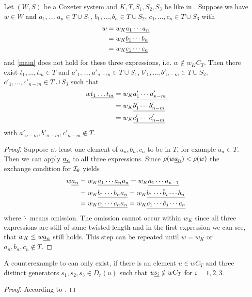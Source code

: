 \begin{prop}
	\label{counterexample-simplification}
	Let $(W,S)$ be a Coxeter system and $K,T,S_1,S_2,S_3$ be like in
	. Suppose we have $w \in W$ and $a_1,\ldots,a_n \in T \cup
	S_1$, $b_1,\ldots,b_n \in T \cup S_2$, $c_1,\ldots,c_n \in T \cup S_3$ with
	\begin{align*}
	w & = w_K \underline{ a_1 \cdots a_n } \\
	  & = w_K \underline{ b_1 \cdots b_n } \\
	  & = w_K \underline{ c_1 \cdots c_n }
	\end{align*}
	and \eqref{main} does not hold for these three expressions, i.e. $w
	\notin w_K C_T$.
	Then there exist $t_1,\ldots,t_m \in T$ and $a'_1,\ldots,a'_{n-m} \in T \cup S_1$,
	$b'_1,\ldots,b'_{n-m} \in T \cup S_2$, $c'_1,\ldots,c'_{n-m} \in T \cup S_3$ such that
	\begin{align*}
	w \underline{t_1 \ldots t_m} & = w_K \underline{ a'_1 \cdots a'_{n-m} } \\
						   & = w_K \underline{ b'_1 \cdots b'_{n-m} } \\
						   & = w_K \underline{ c'_1 \cdots c'_{n-m} }
	\end{align*}
	with $a'_{n-m},b'_{n-m},c'_{n-m} \notin T$.

	\begin{proof}
		Suppose at least one element of $a_n,b_n,c_n$ to be in $T$, for example $a_n \in T$.
		Then we can apply $\underline{a_n}$ to all three expressions. Since $\rho (w \underline{a_n}) < \rho(w)$
		the exchange condition for $\mathcal{I}_{\theta}$ \cite[Proposition 3.10]{hultman:comb-twisted-invo}
		yields
		\begin{align*}
		w \underline{a_n} & = w_K \underline{ a_1 \cdots a_n a_n } = w_K \underline{ a_1 \cdots a_{n-1} } \\
				   & = w_K \underline{ b_1 \cdots b_n a_n } = w_K \underline{ b_1 \cdots \hat b_i \cdots b_n } \\
				   & = w_K \underline{ c_1 \cdots c_n a_n } = w_K \underline{ c_1 \cdots \hat c_j \cdots c_n }
		\end{align*}
		where $\hat \cdot$ means omission. The omission cannot occur within $w_K$ since all three
		expressions are still of same twisted length and in the first expression we can see, that
		$w_K \leq w \underline{a_n}$ still holds. This step can be repeated until $w = w_K$ or
		$a_n,b_n,c_n \notin T$.
	\end{proof}
\end{prop}

\begin{lemm}
	\label{counterexample-simplification}
	A counterexample to  can only exist, if there
	is an element $u \in w C_T$ and three distinct generators $s_1,s_2,s_3 \in
	D_r(u)$ such that $u \underline{s_i} \notin w C_T$ for $i=1,2,3$.

	\begin{proof}
		According to .
	\end{proof}
\end{lemm}

